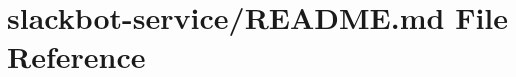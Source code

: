 \hypertarget{slackbot-service_2_r_e_a_d_m_e_8md}{}\section{slackbot-\/service/\+R\+E\+A\+D\+ME.md File Reference}
\label{slackbot-service_2_r_e_a_d_m_e_8md}
